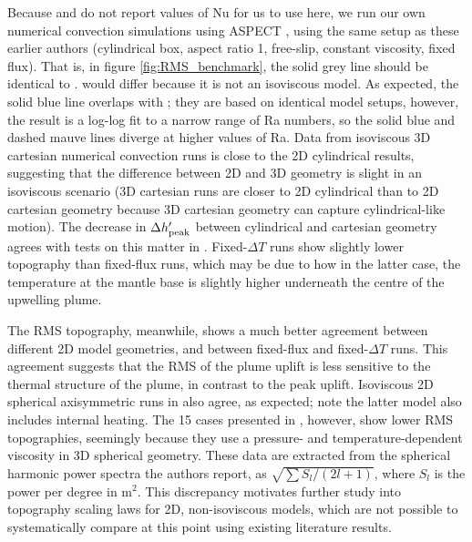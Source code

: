 Because \citet{Nimmo1996} and \citet{Moresi1995} do not report values of Nu for us to use here, we run our own numerical convection simulations using ASPECT \citep[published under the GPL2 license;][]{Bangerth2018}, using the same setup as these earlier authors (cylindrical box, aspect ratio 1, free-slip, constant viscosity, fixed flux). That is, in figure \ref{fig:RMS_benchmark}, the solid grey line should be identical to \citet{Nimmo1996}. \citet{Moresi1995} would differ because it is not an isoviscous model. As expected, the solid blue line overlaps with \citet{Kiefer1992}; they are based on identical model setups, however, the \citet{Kiefer1992} result is a log-log fit to a narrow range of Ra numbers, so the solid blue and dashed mauve lines diverge at higher values of Ra. Data from isoviscous 3D cartesian numerical convection runs \citep{Lees2019} is close to the 2D cylindrical results, suggesting that the difference between 2D and 3D geometry is slight in an isoviscous scenario (3D cartesian runs are closer to 2D cylindrical than to 2D cartesian geometry because 3D cartesian geometry can capture cylindrical-like motion). The decrease in $\Delta h^\prime_{\rm peak}$ between cylindrical and cartesian geometry agrees with tests on this matter in \citet{Kiefer1992}. Fixed-$\Delta T$ runs show slightly lower topography than fixed-flux runs, which may be due to how in the latter case, the temperature at the mantle base is slightly higher underneath the centre of the upwelling plume.

The RMS topography, meanwhile, shows a much better agreement between different 2D model geometries, and between fixed-flux and fixed-$\Delta T$ runs. This agreement suggests that the RMS of the plume uplift is less sensitive to the thermal structure of the plume, in contrast to the peak uplift. Isoviscous 2D spherical axisymmetric runs in \citet{Kiefer1998} also agree, as expected; note the latter model also includes internal heating. The 15 cases presented in \citet{Huang2013}, however, show lower RMS topographies, seemingly because they use a pressure- and temperature-dependent viscosity in 3D spherical geometry. These data are extracted from the spherical harmonic power spectra the authors report, as $\sqrt{\sum {S_l/(2l + 1)}}$, where $S_l$ is the power per degree in m$^2$. This discrepancy motivates further study into topography scaling laws for 2D, non-isoviscous models, which are not possible to systematically compare at this point using existing literature results. 


